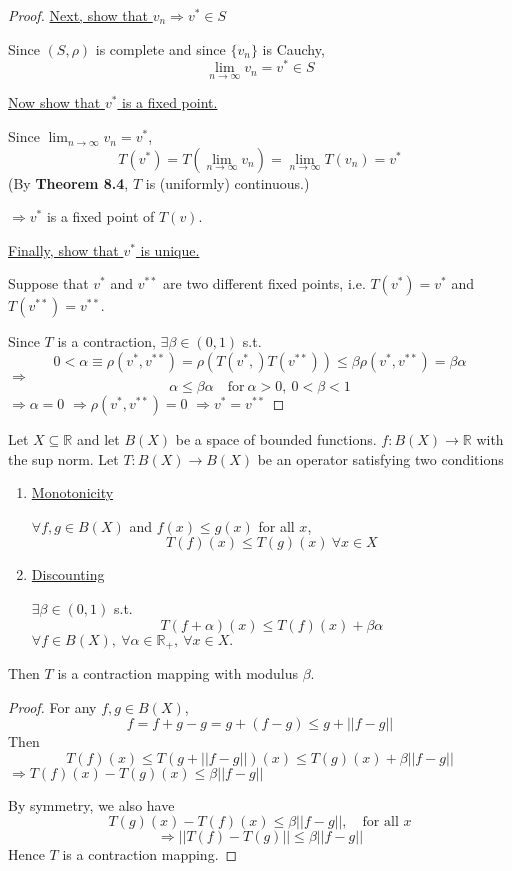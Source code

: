 \documentclass[twoside]{article}
\newcommand\imp{$\Longrightarrow$}
\newcommand\R{\mathbb{R}}
\begin{document}
\begin{proof}
    \underline{Next, show that $v_{n} \Longrightarrow v^{*} \in S$}

    Since $(S, \rho)$ is complete and since $\{v_{n}\}$ is Cauchy,
    \[
    \lim_{n \to \infty} v_{n} = v^{*} \in S
    \]

    \underline{Now show that $v^{*}$ is a fixed point.}

    Since $\lim_{n \to \infty} v_{n} = v^{*}$,
    \[
    T(v^{*}) = T(\lim_{n \to \infty} v_{n} ) = \lim_{n \to \infty} T(v_{n} ) = v^{*}
    \]
    (By \textbf{Theorem 8.4}, $T$ is (uniformly) continuous.)

    \imp $v^{*}$ is a fixed point of $T(v)$.

    \underline{Finally, show that $v^{*}$ is unique.}

    Suppose that $v^{*}$ and $v^{**}$ are two different fixed points, i.e. $T(v^{*}) = v^{*}$ and $T(v^{**}) = v^{**}$.

    Since $T$ is a contraction, $\exists \beta \in (0,1)$ s.t.
    \[
    0 < \alpha \equiv \rho(v^{*}, v^{**}) = \rho(T(v^{*},) T(v^{**})) \leq \beta \rho(v^{*}, v^{**}) = \beta \alpha
    \]
    \imp
    \[
    \alpha \leq \beta \alpha \quad \text{for}~ \alpha >0, ~ 0 < \beta <1
    \]
    \imp $\alpha = 0$ \imp $\rho(v^{*}, v^{**}) = 0$ \imp $v^{*} = v^{**}$
\end{proof}

\begin{theorem}
    Let $X \subseteq \R$ and let $B(X)$ be a space of bounded functions. $f: B(X) \to \R$ with the sup norm. Let $T:B(X) \to B(X)$ be an operator satisfying two conditions
    \begin{enumerate}
        \item \underline{Monotonicity}

        $\forall f, g \in B(X)$ and $f(x) \leq g(x)$ for all $x$,
        \[
        T(f)(x) \leq T(g)(x) ~ \forall x \in X
        \]
        \item \underline{Discounting}

        $\exists \beta \in (0,1)$ s.t. \[
        T(f+ \alpha)(x) \leq T(f)(x) + \beta \alpha
        \]
        $\forall f \in B(X), ~\forall \alpha \in \R_{+}, ~\forall x \in X.$ 
    \end{enumerate}
    Then $T$ is a contraction mapping with modulus $\beta$.
\end{theorem}
\begin{proof}
    For any $f, g \in B(X)$, \[
    f = f +g - g = g + (f-g) \leq g + ||f-g||
    \]
    Then \[
    T(f)(x) \leq T(g + ||f-g||)(x) \leq T(g)(x) + \beta ||f-g||
    \]
    \imp $ T(f)(x) - T(g)(x) \leq \beta ||f-g|| $

    By symmetry, we also have
    \[
     T(g)(x) - T(f)(x) \leq \beta ||f-g||, \quad \text{for all } x
    \]
    \[
    \Longrightarrow ||T(f) - T(g)|| \leq \beta ||f-g|| 
    \]
    Hence $T$ is a contraction mapping.
\end{proof}
\end{document}

